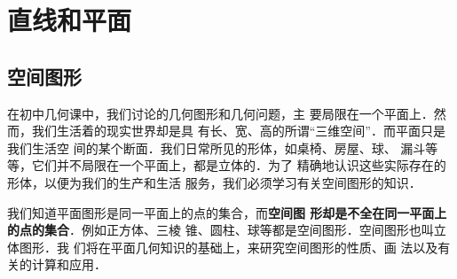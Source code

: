 \chapter{直线和平面}
\section{空间图形}
在初中几何课中，我们讨论的几何图形和几何问题，主
要局限在一个平面上．然而，我们生活着的现实世界却是具
有长、宽、高的所谓“三维空间”．而平面只是我们生活空
间的某个断面．我们日常所见的形体，如桌椅、房屋、球、
漏斗等等，它们并不局限在一个平面上，都是立体的．为了
精确地认识这些实际存在的形体，以便为我们的生产和生活
服务，我们必须学习有关空间图形的知识．

我们知道平面图形是同一平面上的点的集合，而\textbf{空间图
形却是不全在同一平面上的点的集合}．例如正方体、三棱
锥、圆柱、球等都是空间图形．空间图形也叫立体图形．我
们将在平面几何知识的基础上，来研究空间图形的性质、画
法以及有关的计算和应用．

